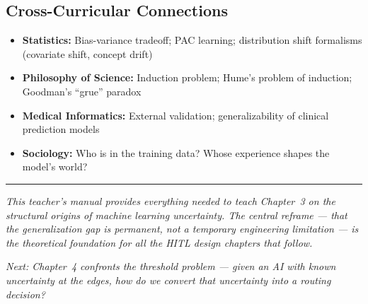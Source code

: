\subsection{Cross-Curricular Connections}
\begin{itemize}
    \item \textbf{Statistics:} Bias-variance tradeoff; PAC learning; distribution shift formalisms (covariate shift, concept drift)
    \item \textbf{Philosophy of Science:} Induction problem; Hume's problem of induction; Goodman's ``grue'' paradox
    \item \textbf{Medical Informatics:} External validation; generalizability of clinical prediction models
    \item \textbf{Sociology:} Who is in the training data? Whose experience shapes the model's world?
\end{itemize}

\bigskip
\begin{center}
\rule{0.5\textwidth}{0.4pt}
\end{center}
\bigskip

\noindent\textit{This teacher's manual provides everything needed to teach Chapter~3 on the structural origins of machine learning uncertainty. The central reframe --- that the generalization gap is permanent, not a temporary engineering limitation --- is the theoretical foundation for all the HITL design chapters that follow.}

\medskip
\noindent\textit{Next: Chapter~4 confronts the threshold problem --- given an AI with known uncertainty at the edges, how do we convert that uncertainty into a routing decision?}
